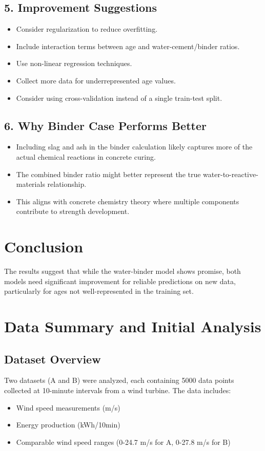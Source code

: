 \documentclass[a4paper,11pt]{article}
\begin{document}
\subsection*{5. Improvement Suggestions}
\begin{itemize}
    \item Consider regularization to reduce overfitting.
    \item Include interaction terms between age and water-cement/binder ratios.
    \item Use non-linear regression techniques.
    \item Collect more data for underrepresented age values.
    \item Consider using cross-validation instead of a single train-test split.
\end{itemize}

\subsection*{6. Why Binder Case Performs Better}
\begin{itemize}
    \item Including slag and ash in the binder calculation likely captures more of the actual chemical reactions in concrete curing.
    \item The combined binder ratio might better represent the true water-to-reactive-materials relationship.
    \item This aligns with concrete chemistry theory where multiple components contribute to strength development.
\end{itemize}

\section*{Conclusion}
The results suggest that while the water-binder model shows promise, both models need significant improvement for reliable predictions on new data, particularly for ages not well-represented in the training set.


\section{Data Summary and Initial Analysis}

\subsection{Dataset Overview}
Two datasets (A and B) were analyzed, each containing 5000 data points collected at 10-minute intervals from a wind turbine. The data includes:
\begin{itemize}
    \item Wind speed measurements (\si{m/s})
    \item Energy production (\si{kWh/10min})
    \item Comparable wind speed ranges (0-24.7 \si{m/s} for A, 0-27.8 \si{m/s} for B)
\end{itemize}
\end{document}
